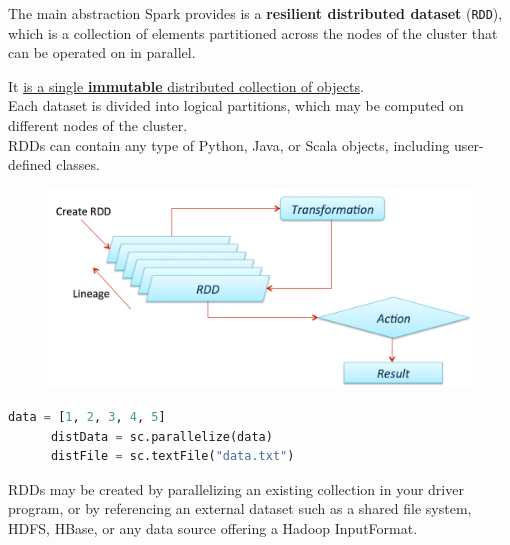 \begin{paracol}{2}
   The main abstraction Spark provides is a \textbf{resilient distributed dataset} (\texttt{RDD}), which is a collection of elements partitioned across the nodes of the cluster that can be operated on in parallel.
   \begin{definition}
      [RDD]
      It \ul{is a single \textbf{immutable} distributed collection of objects}.\\
      Each dataset is divided into logical partitions, which may be computed on different nodes of the cluster.\\
      RDDs can contain any type of Python, Java, or Scala objects, including user-defined classes.
   \end{definition}
   
   \switchcolumn

   \begin{figure}[htbp]
      \centering
      \includegraphics[width=0.8\columnwidth]{images/14/spark_rdd.png}
      \label{fig:14/spark_rdd}
   \end{figure}

\end{paracol}


\begin{paracol}{2}
   \begin{lstlisting}[language=python, caption={Creating an RDD}]
      data = [1, 2, 3, 4, 5]
      distData = sc.parallelize(data)
      distFile = sc.textFile("data.txt")
   \end{lstlisting}
   \switchcolumn
   RDDs may be created by parallelizing an existing collection in your driver program, or by referencing an external dataset such as a shared file system, HDFS, HBase, or any data source offering a Hadoop InputFormat.
\end{paracol}
   
